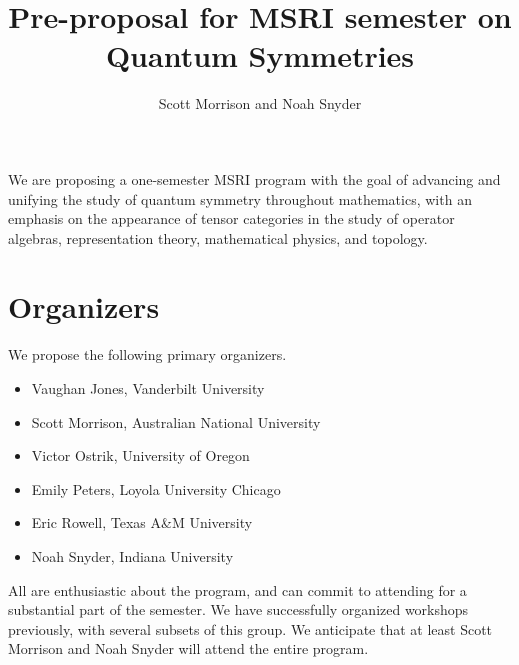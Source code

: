 \documentclass[12pt]{article}
\title{Pre-proposal for MSRI semester on \textbf{Quantum Symmetries}}
\author{Scott Morrison and Noah Snyder}
\begin{document}
\maketitle






We are proposing a one-semester MSRI program with the goal of advancing and unifying the study of quantum symmetry throughout mathematics, with an emphasis on the appearance of tensor categories in the study of operator algebras, representation theory, mathematical physics, and topology.

\section{Organizers}
We propose the following primary organizers.
\begin{itemize}
  \setlength{\itemsep}{1pt}
  \setlength{\parskip}{0pt}
  \setlength{\parsep}{0pt}
\item Vaughan Jones, Vanderbilt University
\item Scott Morrison, Australian National University
\item Victor Ostrik, University of Oregon
\item Emily Peters, Loyola University Chicago
\item Eric Rowell, Texas A\&M University
\item Noah Snyder, Indiana University
\end{itemize}
All are enthusiastic about the program, and can commit to attending for a substantial part of the semester. We have successfully organized workshops previously, with several subsets of this group.  We anticipate that at least Scott Morrison and Noah Snyder will attend the entire program.
\end{document}
